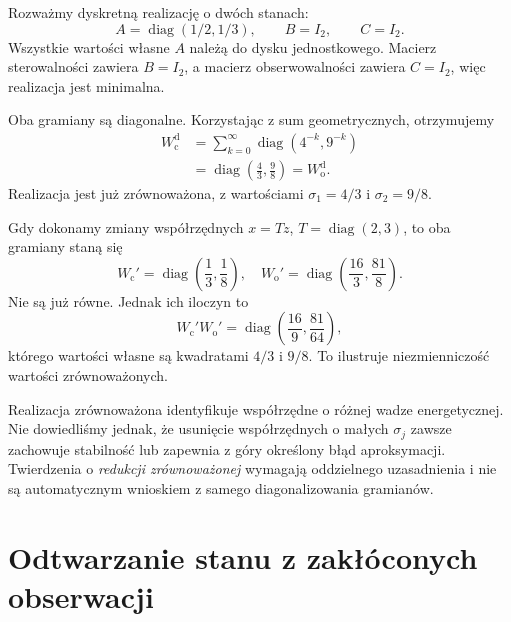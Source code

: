 \begin{przyklad}
\label{prz:lin27-balanced}
Rozważmy dyskretną
realizację o dwóch stanach:
\[
 A=\operatorname{diag}(1/2,1/3),
 \qquad B=I_2,\qquad C=I_2.
\]
Wszystkie wartości własne \(A\)
należą do dysku jednostkowego.
Macierz sterowalności zawiera
\(B=I_2\), a macierz
obserwowalności zawiera
\(C=I_2\), więc realizacja
jest minimalna.

Oba gramiany są diagonalne.
Korzystając z sum
geometrycznych,
otrzymujemy
\[
 \begin{aligned}
 W_{\mathrm c}^{\mathrm d}
 &=\sum_{k=0}^{\infty}
       \operatorname{diag}
          (4^{-k},9^{-k})\\
 &=\operatorname{diag}
       \left(\frac43,\frac98\right)
  =W_{\mathrm o}^{\mathrm d}.
 \end{aligned}
\]
Realizacja jest już
zrównoważona, z wartościami
\(\sigma_1=4/3\)
i \(\sigma_2=9/8\).

Gdy dokonamy zmiany
współrzędnych \(x=Tz\),
\(T=\operatorname{diag}(2,3)\),
to oba gramiany staną się
\[
 W_{\mathrm c}'=
 \operatorname{diag}
   \left(\frac13,\frac18\right),
 \quad
 W_{\mathrm o}'=
 \operatorname{diag}
   \left(\frac{16}{3},\frac{81}{8}\right).
\]
Nie są już równe.
Jednak ich iloczyn to
\[
 W_{\mathrm c}'W_{\mathrm o}'
 =\operatorname{diag}
    \left(\frac{16}{9},\frac{81}{64}\right),
\]
którego wartości własne
są kwadratami
\(4/3\) i \(9/8\).
To ilustruje niezmienniczość
wartości zrównoważonych.
\end{przyklad}

\begin{uwaga}
\label{rem:lin27-truncation}
Realizacja zrównoważona
identyfikuje współrzędne
o różnej wadze energetycznej.
Nie dowiedliśmy jednak,
że usunięcie współrzędnych
o małych \(\sigma_j\)
zawsze zachowuje
stabilność lub zapewnia
z góry określony błąd
aproksymacji.
Twierdzenia o
\emph{redukcji zrównoważonej}
wymagają oddzielnego
uzasadnienia i
nie są automatycznym
wnioskiem z samego
diagonalizowania gramianów.
\end{uwaga}

\section{Odtwarzanie stanu z zakłóconych obserwacji}
\label{sec:lin27-noise}

